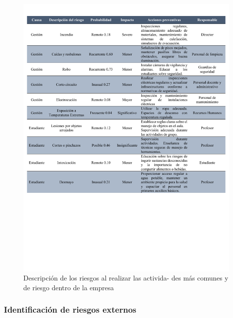     \begin{figure}[H] 
        \centering
        \includegraphics[trim = {1mm 70mm 1mm 10mm},clip,scale=0.38]{22/Img/riesgosInternos.pdf}
        \caption{Descripción de los riesgos al realizar las activida-
    des más comunes y de riesgo dentro de la empresa}
        \label{fig:ideIn}
    \end{figure}
    
    \subsubsection{Identificación de riesgos externos}
    
